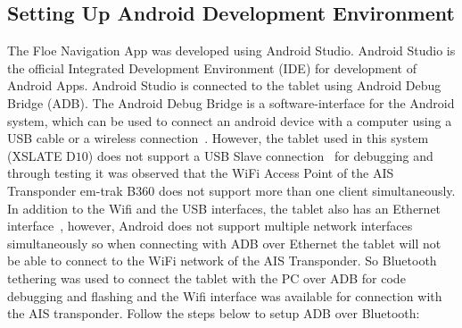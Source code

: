 \subsection{Setting Up Android Development Environment}
\label{sec:sec6_1_1}
\noindent
The Floe Navigation App was developed using Android Studio. Android Studio is the official Integrated Development Environment (IDE) for development of Android Apps. Android Studio is connected to the tablet using Android Debug Bridge (ADB). The Android Debug Bridge is a software-interface for the Android system, which can be used to connect an android device with a computer using a USB cable or a wireless connection~\cite{droidwiki}.
\newline
\noindent
However, the tablet used in this system (XSLATE D$10$) does not support a USB Slave connection~\cite{tablet:xslated10} for debugging and through testing it was observed that the WiFi Access Point of the AIS Transponder em-trak B$360$ does not support more than one client simultaneously. In addition to the Wifi and the USB interfaces, the tablet also has an Ethernet interface~\cite{tablet:xslated10}, however, Android does not support multiple network interfaces simultaneously so when connecting with ADB over Ethernet the tablet will not be able to connect to the WiFi network of the AIS Transponder. So Bluetooth tethering was used to connect the tablet with the PC over ADB for code debugging and flashing and the Wifi interface was available for connection with the AIS transponder.
\newline
\noindent
Follow the steps below to setup ADB over Bluetooth:

